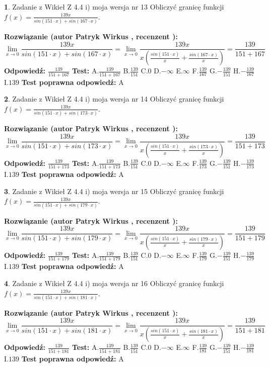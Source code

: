 \documentclass[12pt, a4paper]{article}
\theoremstyle{definition} %
\newtheorem{zad}{}
\newcommand{\zadStart}[1]{\begin{zad}#1\newline}
\newcommand{\zadStop}{\end{zad}}
\newcommand{\rozwStart}[2]{\noindent \textbf{Rozwiązanie (autor #1 , recenzent #2): }\newline}
\newcommand{\rozwStop}{\newline}
\newcommand{\odpStart}{\noindent \textbf{Odpowiedź:}\newline}
\newcommand{\odpStop}{\newline}
\newcommand{\testStart}{\noindent \textbf{Test:}\newline}
\newcommand{\testStop}{\newline}
\newcommand{\kluczStart}{\noindent \textbf{Test poprawna odpowiedź:}\newline}
\newcommand{\kluczStop}{\newline}
\begin{document}
\zadStart{Zadanie z Wikieł Z 4.4 i) moja wersja nr 13}
Obliczyć granicę funkcji $f(x)=\frac{139x}{sin(151\cdot x) +sin(167\cdot x)}$.
\zadStop
\rozwStart{Patryk Wirkus}{}
$$\lim\limits_{x\to 0}\frac{139x}{sin(151\cdot x) +sin(167\cdot x)}=\lim\limits_{x\to 0}\frac{139x}{x(\frac{sin(151\cdot x)}{x}+\frac{sin(167\cdot x)}{x})}=\frac{139}{151+167}$$
\rozwStop
\odpStart
$\frac{139}{151+167}$
\odpStop
\testStart
A.$\frac{139}{151+167}$
B.$\frac{139}{151}$
C.$0$
D.$-\infty$
E.$\infty$
F.$\frac{139}{167}$
G.$-\frac{139}{151}$
H.$-\frac{139}{167}$
I.$139$
\testStop
\kluczStart
A
\kluczStop



\zadStart{Zadanie z Wikieł Z 4.4 i) moja wersja nr 14}
Obliczyć granicę funkcji $f(x)=\frac{139x}{sin(151\cdot x) +sin(173\cdot x)}$.
\zadStop
\rozwStart{Patryk Wirkus}{}
$$\lim\limits_{x\to 0}\frac{139x}{sin(151\cdot x) +sin(173\cdot x)}=\lim\limits_{x\to 0}\frac{139x}{x(\frac{sin(151\cdot x)}{x}+\frac{sin(173\cdot x)}{x})}=\frac{139}{151+173}$$
\rozwStop
\odpStart
$\frac{139}{151+173}$
\odpStop
\testStart
A.$\frac{139}{151+173}$
B.$\frac{139}{151}$
C.$0$
D.$-\infty$
E.$\infty$
F.$\frac{139}{173}$
G.$-\frac{139}{151}$
H.$-\frac{139}{173}$
I.$139$
\testStop
\kluczStart
A
\kluczStop



\zadStart{Zadanie z Wikieł Z 4.4 i) moja wersja nr 15}
Obliczyć granicę funkcji $f(x)=\frac{139x}{sin(151\cdot x) +sin(179\cdot x)}$.
\zadStop
\rozwStart{Patryk Wirkus}{}
$$\lim\limits_{x\to 0}\frac{139x}{sin(151\cdot x) +sin(179\cdot x)}=\lim\limits_{x\to 0}\frac{139x}{x(\frac{sin(151\cdot x)}{x}+\frac{sin(179\cdot x)}{x})}=\frac{139}{151+179}$$
\rozwStop
\odpStart
$\frac{139}{151+179}$
\odpStop
\testStart
A.$\frac{139}{151+179}$
B.$\frac{139}{151}$
C.$0$
D.$-\infty$
E.$\infty$
F.$\frac{139}{179}$
G.$-\frac{139}{151}$
H.$-\frac{139}{179}$
I.$139$
\testStop
\kluczStart
A
\kluczStop



\zadStart{Zadanie z Wikieł Z 4.4 i) moja wersja nr 16}
Obliczyć granicę funkcji $f(x)=\frac{139x}{sin(151\cdot x) +sin(181\cdot x)}$.
\zadStop
\rozwStart{Patryk Wirkus}{}
$$\lim\limits_{x\to 0}\frac{139x}{sin(151\cdot x) +sin(181\cdot x)}=\lim\limits_{x\to 0}\frac{139x}{x(\frac{sin(151\cdot x)}{x}+\frac{sin(181\cdot x)}{x})}=\frac{139}{151+181}$$
\rozwStop
\odpStart
$\frac{139}{151+181}$
\odpStop
\testStart
A.$\frac{139}{151+181}$
B.$\frac{139}{151}$
C.$0$
D.$-\infty$
E.$\infty$
F.$\frac{139}{181}$
G.$-\frac{139}{151}$
H.$-\frac{139}{181}$
I.$139$
\testStop
\kluczStart
A
\kluczStop
\end{document}
